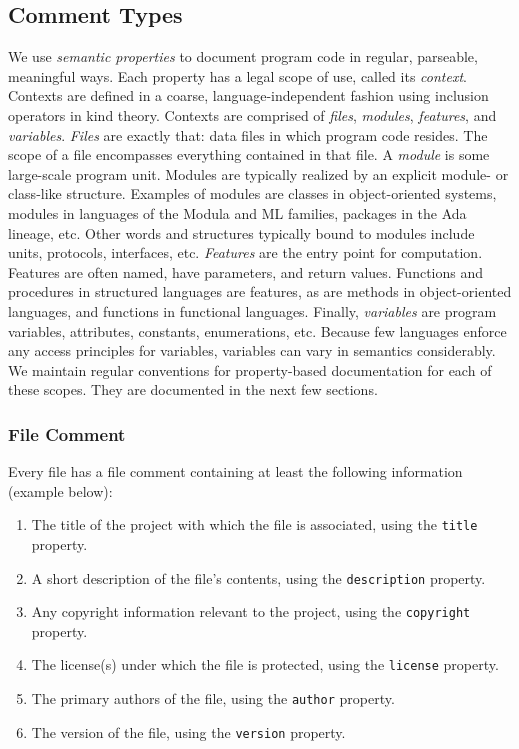 \documentclass[10pt,letter]{article}
\begin{document}
\subsection{Comment Types}
We use \textit{semantic properties} to document program code in regular, parseable, meaningful ways.
Each property has a legal scope of use, called its \textit{context}. Contexts are defined in a coarse, language-independent fashion using inclusion operators in kind theory. Contexts are comprised of \textit{files}, \textit{modules}, \textit{features}, and \textit{variables}.
\textit{Files} are exactly that: data files in which program code resides. The scope of a file encompasses everything contained in that file.
A \textit{module} is some large-scale program unit. Modules are typically realized by an explicit module- or class-like structure. Examples of modules are classes in object-oriented systems, modules in languages of the Modula and ML families, packages in the Ada lineage, etc. Other words and structures typically bound to modules include units, protocols, interfaces, etc.
\textit{Features} are the entry point for computation. Features are often named, have parameters, and return values. Functions and procedures in structured languages are features, as are methods in object-oriented languages, and functions in functional languages.
Finally, \textit{variables} are program variables, attributes, constants, enumerations, etc. Because few languages enforce any access principles for variables, variables can vary in semantics considerably.
We maintain regular conventions for property-based documentation for each of these scopes. They are documented in the next few sections.

\subsubsection{File Comment}

Every file has a file comment containing at least the following information (example below):

\begin{enumerate}
  \item The title of the project with which the file is associated, using the \texttt{title} property.
  \item A short description of the file's contents, using the \texttt{description} property.
  \item Any copyright information relevant to the project, using the \texttt{copyright} property.
  \item The license(s) under which the file is protected, using the \texttt{license} property.
  \item The primary authors of the file, using the \texttt{author} property.
  \item The version of the file, using the \texttt{version} property. 
\end{enumerate}
\end{document}
